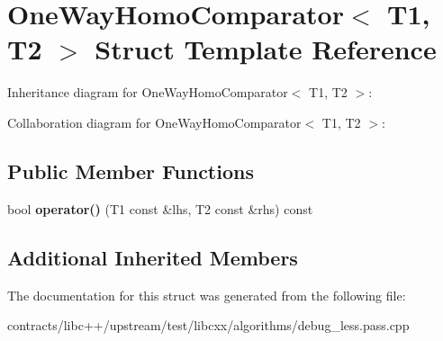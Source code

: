 \hypertarget{struct_one_way_homo_comparator}{}\section{One\+Way\+Homo\+Comparator$<$ T1, T2 $>$ Struct Template Reference}
\label{struct_one_way_homo_comparator}


Inheritance diagram for One\+Way\+Homo\+Comparator$<$ T1, T2 $>$\+:


Collaboration diagram for One\+Way\+Homo\+Comparator$<$ T1, T2 $>$\+:
\subsection*{Public Member Functions}
\begin{DoxyCompactItemize}
\item 
\mbox{\label{struct_one_way_homo_comparator_a7d38825d74eae4015770dbc079d403d4}} 
bool {\bfseries operator()} (T1 const \&lhs, T2 const \&rhs) const
\end{DoxyCompactItemize}
\subsection*{Additional Inherited Members}


The documentation for this struct was generated from the following file\+:\begin{DoxyCompactItemize}
\item 
contracts/libc++/upstream/test/libcxx/algorithms/debug\+\_\+less.\+pass.\+cpp\end{DoxyCompactItemize}
